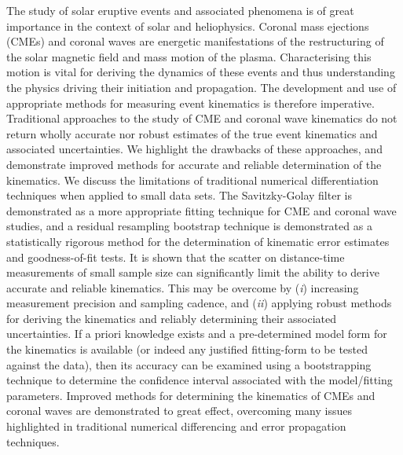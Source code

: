 \documentclass[structabstract]{aa}
\begin{document}
\date{Received ?; accepted ?}
\abstract
{The study of solar eruptive events and associated phenomena is of great importance in the context of solar and heliophysics. Coronal mass ejections (CMEs) and coronal waves are energetic manifestations of the restructuring of the solar magnetic field and mass motion of the plasma. Characterising this motion is vital for deriving the dynamics of these events and thus understanding the physics driving their initiation and propagation. The development and use of appropriate methods for measuring event kinematics is therefore imperative.} 
{Traditional approaches to the study of CME and coronal wave kinematics do not return wholly accurate nor robust estimates of the true event kinematics and associated uncertainties. We highlight the drawbacks of these approaches, and demonstrate improved methods for accurate and reliable determination of the kinematics.}
{We discuss the limitations of traditional numerical differentiation techniques when applied to small data sets. The Savitzky-Golay filter is demonstrated as a more appropriate fitting technique for CME and coronal wave studies, and a residual resampling bootstrap technique is demonstrated as a statistically rigorous method for the determination of kinematic error estimates and goodness-of-fit tests.}
{It is shown that the scatter on distance-time measurements of small sample size can significantly limit the ability to derive accurate and reliable kinematics. This may be overcome by (\emph{i}) increasing measurement precision and sampling cadence, and (\emph{ii}) applying robust methods for deriving the kinematics and reliably determining their associated uncertainties. If a priori knowledge exists and a pre-determined model form for the kinematics is available (or indeed any justified fitting-form to be tested against the data), then its accuracy can be examined using a bootstrapping technique to determine the confidence interval associated with the model/fitting parameters.}
{Improved methods for determining the kinematics of CMEs and coronal waves are demonstrated to great effect, overcoming many issues highlighted in traditional numerical differencing and error propagation techniques.}


\end{document}
